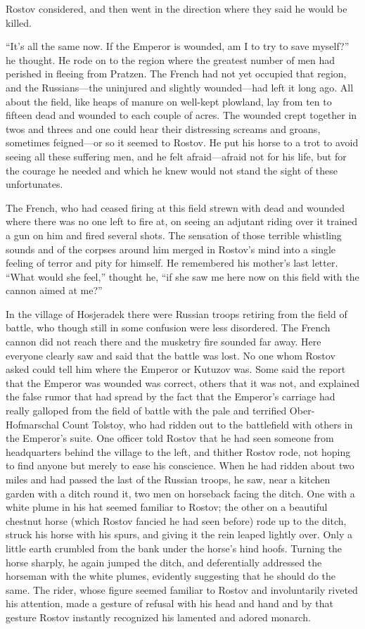 Rostov considered, and then went in the direction where they said
he would be killed.

``It's all the same now. If the Emperor is wounded, am I to try
to save myself?'' he thought. He rode on to the region where the
greatest number of men had perished in fleeing from Pratzen. The
French had not yet occupied that region, and the Russians---the
uninjured and slightly wounded---had left it long ago. All about
the field, like heaps of manure on well-kept plowland, lay from
ten to fifteen dead and wounded to each couple of acres. The
wounded crept together in twos and threes and one could hear
their distressing screams and groans, sometimes feigned---or so
it seemed to Rostov. He put his horse to a trot to avoid seeing
all these suffering men, and he felt afraid---afraid not for his
life, but for the courage he needed and which he knew would not
stand the sight of these unfortunates.

The French, who had ceased firing at this field strewn with dead
and wounded where there was no one left to fire at, on seeing an
adjutant riding over it trained a gun on him and fired several
shots. The sensation of those terrible whistling sounds and of
the corpses around him merged in Rostov's mind into a single
feeling of terror and pity for himself. He remembered his
mother's last letter. ``What would she feel,'' thought he, ``if
she saw me here now on this field with the cannon aimed at me?''

In the village of Hosjeradek there were Russian troops retiring
from the field of battle, who though still in some confusion were
less disordered. The French cannon did not reach there and the
musketry fire sounded far away. Here everyone clearly saw and
said that the battle was lost. No one whom Rostov asked could
tell him where the Emperor or Kutuzov was. Some said the report
that the Emperor was wounded was correct, others that it was not,
and explained the false rumor that had spread by the fact that
the Emperor's carriage had really galloped from the field of
battle with the pale and terrified Ober-Hofmarschal Count
Tolstoy, who had ridden out to the battlefield with others in the
Emperor's suite. One officer told Rostov that he had seen someone
from headquarters behind the village to the left, and thither
Rostov rode, not hoping to find anyone but merely to ease his
conscience. When he had ridden about two miles and had passed the
last of the Russian troops, he saw, near a kitchen garden with a
ditch round it, two men on horseback facing the ditch. One with a
white plume in his hat seemed familiar to Rostov; the other on a
beautiful chestnut horse (which Rostov fancied he had seen
before) rode up to the ditch, struck his horse with his spurs,
and giving it the rein leaped lightly over. Only a little earth
crumbled from the bank under the horse's hind hoofs. Turning the
horse sharply, he again jumped the ditch, and deferentially
addressed the horseman with the white plumes, evidently
suggesting that he should do the same. The rider, whose figure
seemed familiar to Rostov and involuntarily riveted his
attention, made a gesture of refusal with his head and hand and
by that gesture Rostov instantly recognized his lamented and
adored monarch.

